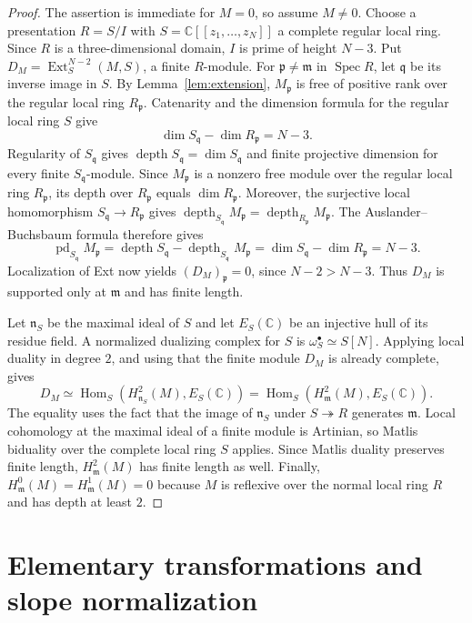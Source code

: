 \documentclass[11pt,reqno]{amsart}
\numberwithin{equation}{section}
\theoremstyle{definition}
\theoremstyle{remark}
\newcommand{\C}{\mathbb C}
\newcommand{\mm}{\mathfrak m}
\newcommand{\Spec}{\operatorname{Spec}}
\newcommand{\depth}{\operatorname{depth}}
\newcommand{\Hom}{\operatorname{Hom}}
\newcommand{\Ext}{\operatorname{Ext}}
\begin{document}
\begin{proof}
The assertion is immediate for $M=0$, so assume $M\ne0$.
Choose a presentation $R=S/I$ with
$S=\C[[z_1,\ldots,z_N]]$ a complete regular local ring. Since $R$
is a three-dimensional domain, $I$ is prime of height $N-3$.
Put $D_M=\Ext_S^{N-2}(M,S)$, a finite $R$-module.
For $\mathfrak p\ne\mm$ in $\Spec R$, let $\mathfrak q$ be its inverse
image in $S$. By Lemma~\ref{lem:extension}, $M_\mathfrak p$ is free
of positive rank over the regular local ring $R_\mathfrak p$.
Catenarity and the dimension formula for the regular local ring $S$
give
\[
 \dim S_\mathfrak q-\dim R_\mathfrak p=N-3.
\]
Regularity of $S_\mathfrak q$ gives
$\depth S_\mathfrak q=\dim S_\mathfrak q$ and finite projective dimension
for every finite $S_\mathfrak q$-module. Since $M_\mathfrak p$ is a
nonzero free module over the regular local ring $R_\mathfrak p$, its
depth over $R_\mathfrak p$ equals $\dim R_\mathfrak p$. Moreover, the
surjective local homomorphism $S_\mathfrak q\to R_\mathfrak p$ gives
$\depth_{S_\mathfrak q}M_\mathfrak p=
\depth_{R_\mathfrak p}M_\mathfrak p$.
The Auslander--Buchsbaum formula \cite[Tag 090V]{Stacks} therefore gives
\[
 \operatorname{pd}_{S_\mathfrak q}M_\mathfrak p
 =\depth S_\mathfrak q-\depth_{S_\mathfrak q}M_\mathfrak p
 =\dim S_\mathfrak q-\dim R_\mathfrak p=N-3.
\]
Localization of Ext now yields $(D_M)_\mathfrak p=0$, since $N-2>N-3$.
Thus $D_M$ is supported only at $\mm$ and has finite length.

Let $\mathfrak n_S$ be the maximal ideal of $S$ and let $E_S(\C)$ be
an injective hull of its residue field. A normalized dualizing complex
for $S$ is $\omega_S^\bullet\simeq S[N]$. Applying local duality
\cite[Tag 0AAK]{Stacks} in degree $2$, and using that the finite module
$D_M$ is already complete, gives
\[
 D_M\simeq\Hom_S(H^2_{\mathfrak n_S}(M),E_S(\C))
       =\Hom_S(H^2_\mm(M),E_S(\C)).
\]
The equality uses the fact that the image of $\mathfrak n_S$ under
$S\twoheadrightarrow R$ generates $\mm$. Local cohomology at the maximal
ideal of a finite module is Artinian, so Matlis biduality over the
complete local ring $S$ applies. Since Matlis duality preserves finite
length, $H^2_\mm(M)$ has finite length as well. Finally,
$H^0_\mm(M)=H^1_\mm(M)=0$ because $M$ is reflexive over the normal
local ring $R$ and has depth at least $2$.
\end{proof}

\section{Elementary transformations and slope normalization}\label{sec:normalization}
\end{document}
